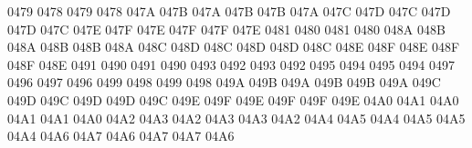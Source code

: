  0479 0478 %
 0479 0478 %
\setcclcuc 047A 047B 047A %
\setcclcuc 047B 047B 047A %
\setcclcuc 047C 047D 047C %
\setcclcuc 047D 047D 047C %
\setcclcuc 047E 047F 047E %
\setcclcuc 047F 047F 047E %
 0481 0480 %
 0481 0480 %
\setcclcuc 048A 048B 048A %
\setcclcuc 048B 048B 048A %
\setcclcuc 048C 048D 048C %
\setcclcuc 048D 048D 048C %
\setcclcuc 048E 048F 048E %
\setcclcuc 048F 048F 048E %
 0491 0490 %
 0491 0490 %
 0493 0492 %
 0493 0492 %
 0495 0494 %
 0495 0494 %
 0497 0496 %
 0497 0496 %
 0499 0498 %
 0499 0498 %
\setcclcuc 049A 049B 049A %
\setcclcuc 049B 049B 049A %
\setcclcuc 049C 049D 049C %
\setcclcuc 049D 049D 049C %
\setcclcuc 049E 049F 049E %
\setcclcuc 049F 049F 049E %
\setcclcuc 04A0 04A1 04A0 %
\setcclcuc 04A1 04A1 04A0 %
\setcclcuc 04A2 04A3 04A2 %
\setcclcuc 04A3 04A3 04A2 %
\setcclcuc 04A4 04A5 04A4 %
\setcclcuc 04A5 04A5 04A4 %
\setcclcuc 04A6 04A7 04A6 %
\setcclcuc 04A7 04A7 04A6 %
